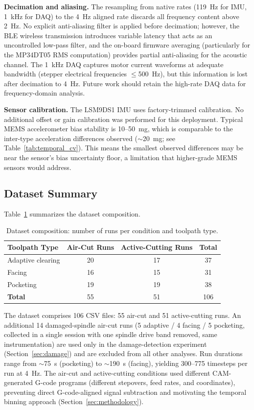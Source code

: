 \textbf{Decimation and aliasing.} The resampling from native rates (\SI{119}{\hertz} for IMU, \SI{1}{\kilo\hertz} for DAQ) to the \SI{4}{\hertz} aligned rate discards all frequency content above \SI{2}{\hertz}. No explicit anti-aliasing filter is applied before decimation; however, the BLE wireless transmission introduces variable latency that acts as an uncontrolled low-pass filter, and the on-board firmware averaging (particularly for the MP34DT05 RMS computation) provides partial anti-aliasing for the acoustic channel. The \SI{1}{\kilo\hertz} DAQ captures motor current waveforms at adequate bandwidth (stepper electrical frequencies $\leq$\SI{500}{\hertz}), but this information is lost after decimation to \SI{4}{\hertz}. Future work should retain the high-rate DAQ data for frequency-domain analysis.

\textbf{Sensor calibration.} The LSM9DS1 IMU uses factory-trimmed calibration. No additional offset or gain calibration was performed for this deployment. Typical MEMS accelerometer bias stability is \SI{10}{}--\SI{50}{\milli\g}, which is comparable to the inter-type acceleration differences observed ($\sim$\SI{20}{\milli\g}; see Table~\ref{tab:temporal_cv}). This means the smallest observed differences may be near the sensor's bias uncertainty floor, a limitation that higher-grade MEMS sensors would address.

\subsection{Dataset Summary}

Table~\ref{tab:dataset} summarizes the dataset composition.

\begin{table}[H]
\caption{Dataset composition: number of runs per condition and toolpath type.}\label{tab:dataset}
\centering
\begin{tabular}{lccc}
\toprule
\textbf{Toolpath Type} & \textbf{Air-Cut Runs} & \textbf{Active-Cutting Runs} & \textbf{Total} \\
\midrule
Adaptive clearing & 20 & 17 & 37 \\
Facing            & 16 & 15 & 31 \\
Pocketing         & 19 & 19 & 38 \\
\midrule
\textbf{Total}    & 55 & 51 & 106 \\
\bottomrule
\end{tabular}
\end{table}

The dataset comprises 106 CSV files: 55 air-cut and 51 active-cutting runs. An additional 14 damaged-spindle air-cut runs (5 adaptive / 4 facing / 5 pocketing, collected in a single session with one spindle drive band removed, same instrumentation) are used only in the damage-detection experiment (Section~\ref{sec:damage}) and are excluded from all other analyses. Run durations range from $\sim$\SI{75}{\second} (pocketing) to $\sim$\SI{190}{\second} (facing), yielding 300--775 timesteps per run at \SI{4}{\hertz}. The air-cut and active-cutting conditions used different CAM-generated G-code programs (different stepovers, feed rates, and coordinates), preventing direct G-code-aligned signal subtraction and motivating the temporal binning approach (Section~\ref{sec:methodology}).
